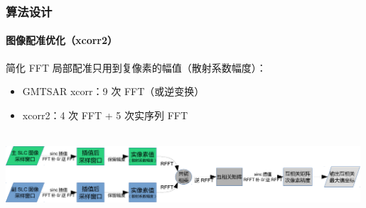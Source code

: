 \documentclass{beamer}
\begin{document}
\begin{frame}
    \frametitle{算法设计}
    \framesubtitle{图像配准优化（xcorr2）}

    \begin{block}{简化 FFT}
        局部配准只用到复像素的幅值（散射系数幅度）：
        \begin{itemize}
            \item GMTSAR xcorr：9 次 FFT（或逆变换）
            \item xcorr2：4 次 FFT + 5 次实序列 FFT
        \end{itemize}
        ~\\
        \includegraphics[width=0.99\textwidth]{figures/xcorr2-crop.pdf}
    \end{block}
\end{frame}
\end{document}
